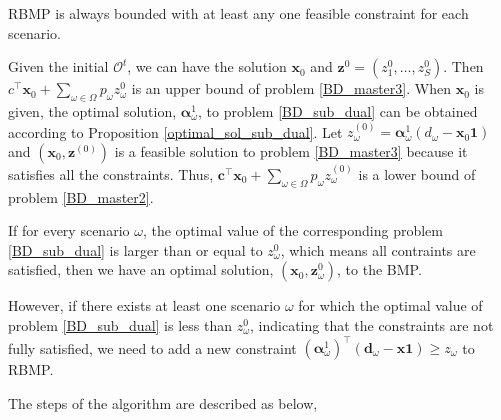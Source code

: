 \begin{prop}\label{one_ep_feasible}
RBMP is always bounded with at least any one feasible constraint for each scenario.
\end{prop}

Given the initial $\mathcal{O}^{t}$, we can have the solution $\mathbf{x}_{0}$ and $\mathbf{z}^{0} =(z^{0}_1,\ldots, z^{0}_S)$. Then $c^{\intercal} \mathbf{x}_0 + \sum_{\omega \in \Omega} p_{\omega} z_{\omega}^{0}$ is an upper bound of problem \eqref{BD_master3}. When $\mathbf{x}_0$ is given, the optimal solution, $\bm{\alpha}_{\omega}^{1}$, to problem \eqref{BD_sub_dual} can be obtained according to Proposition \ref{optimal_sol_sub_dual}. Let $z_{\omega}^{(0)} = \bm{\alpha}_{\omega}^{1}(d_{\omega} - \mathbf{x}_0 \mathbf{1})$ and $(\mathbf{x}_0, \mathbf{z}^{(0)})$ is a feasible solution to problem \eqref{BD_master3} because it satisfies all the constraints. Thus, $\mathbf{c}^{\intercal} \mathbf{x}_0 + \sum_{\omega \in \Omega} p_{\omega} z_{\omega}^{(0)}$ is a lower bound of problem \eqref{BD_master2}.

If for every scenario $\omega$, the optimal value of the corresponding problem \eqref{BD_sub_dual} is larger than or equal to $z_{\omega}^{0}$, which means all contraints are satisfied, then we have an optimal solution, $(\mathbf{x}_{0}, \mathbf{z}_{\omega}^{0})$, to the BMP. 

However, if there exists at least one scenario $\omega$ for which the optimal value of problem \eqref{BD_sub_dual} is less than $z_{\omega}^{0}$, indicating that the constraints are not fully satisfied, we need to add a new constraint $(\bm{\alpha}_{\omega}^{1})^{\intercal}(\mathbf{d}_{\omega} - \mathbf{x} \mathbf{1}) \geq z_{\omega}$ to RBMP.




The steps of the algorithm are described as below,

